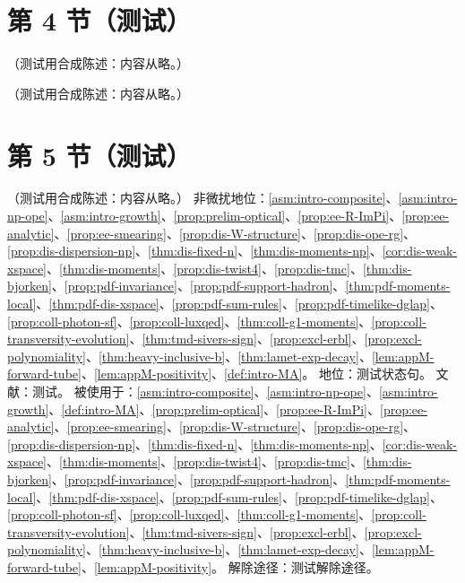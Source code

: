 \section{第 4 节（测试）}\label{sec:intro-tags}

\begin{definition}[误差类型]\label{def:intro-error-types}
（测试用合成陈述：内容从略。）
\end{definition}

\begin{remark}[与文献中另一种分级的对照]\label{rem:intro-grade-dictionary}
（测试用合成陈述：内容从略。）
\end{remark}

\section{第 5 节（测试）}\label{sec:intro-kinds}

\begin{assumption}\label{asm:intro-wightman}
（测试用合成陈述：内容从略。）
非微扰地位：\cref{asm:intro-composite}、\cref{asm:intro-np-ope}、\cref{asm:intro-growth}、\cref{prop:prelim-optical}、\cref{prop:ee-R-ImPi}、\cref{prop:ee-analytic}、\cref{prop:ee-smearing}、\cref{prop:dis-W-structure}、\cref{prop:dis-ope-rg}、\cref{prop:dis-dispersion-np}、\cref{thm:dis-fixed-n}、\cref{thm:dis-moments-np}、\cref{cor:dis-weak-xspace}、\cref{thm:dis-moments}、\cref{prop:dis-twist4}、\cref{prop:dis-tmc}、\cref{thm:dis-bjorken}、\cref{prop:pdf-invariance}、\cref{prop:pdf-support-hadron}、\cref{thm:pdf-moments-local}、\cref{thm:pdf-dis-xspace}、\cref{prop:pdf-sum-rules}、\cref{prop:pdf-timelike-dglap}、\cref{prop:coll-photon-sf}、\cref{prop:coll-luxqed}、\cref{thm:coll-g1-moments}、\cref{prop:coll-transversity-evolution}、\cref{thm:tmd-sivers-sign}、\cref{prop:excl-erbl}、\cref{prop:excl-polynomiality}、\cref{thm:heavy-inclusive-b}、\cref{thm:lamet-exp-decay}、\cref{lem:appM-forward-tube}、\cref{lem:appM-positivity}、\cref{def:intro-MA}。
地位：测试状态句。
文献：测试。
被使用于：\cref{asm:intro-composite}、\cref{asm:intro-np-ope}、\cref{asm:intro-growth}、\cref{def:intro-MA}、\cref{prop:prelim-optical}、\cref{prop:ee-R-ImPi}、\cref{prop:ee-analytic}、\cref{prop:ee-smearing}、\cref{prop:dis-W-structure}、\cref{prop:dis-ope-rg}、\cref{prop:dis-dispersion-np}、\cref{thm:dis-fixed-n}、\cref{thm:dis-moments-np}、\cref{cor:dis-weak-xspace}、\cref{thm:dis-moments}、\cref{prop:dis-twist4}、\cref{prop:dis-tmc}、\cref{thm:dis-bjorken}、\cref{prop:pdf-invariance}、\cref{prop:pdf-support-hadron}、\cref{thm:pdf-moments-local}、\cref{thm:pdf-dis-xspace}、\cref{prop:pdf-sum-rules}、\cref{prop:pdf-timelike-dglap}、\cref{prop:coll-photon-sf}、\cref{prop:coll-luxqed}、\cref{thm:coll-g1-moments}、\cref{prop:coll-transversity-evolution}、\cref{thm:tmd-sivers-sign}、\cref{prop:excl-erbl}、\cref{prop:excl-polynomiality}、\cref{thm:heavy-inclusive-b}、\cref{thm:lamet-exp-decay}、\cref{lem:appM-forward-tube}、\cref{lem:appM-positivity}。
解除途径：测试解除途径。
\end{assumption}

